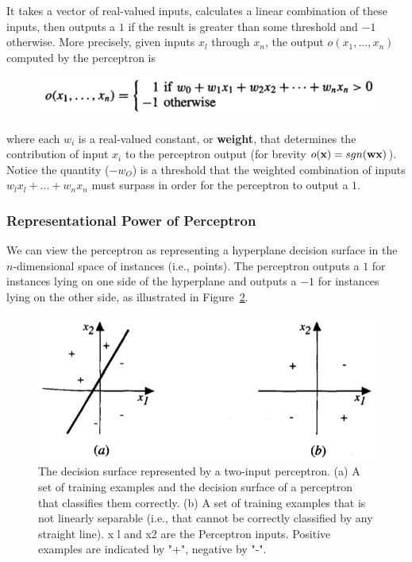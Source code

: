 \documentclass[../main.tex]{subfiles}
\begin{document}
\noindent It takes a vector of real-valued inputs, calculates a linear combination of these inputs, then outputs a $1$ if the result is greater than some threshold and $-1$ otherwise. More precisely, given inputs $x_l$ through $x_n$, the output $o(x_1, . . . , x_n)$ computed by the perceptron is
\begin{figure}[H]
    \centering
    \includegraphics[scale = 0.35]{lectures/4_neural_networks/4_out_perc.png}
    \label{fig:out_perc}
\end{figure}
\noindent where each $w_i$ is a real-valued constant, or \textbf{weight}, that determines the contribution of input $x_i$ to the perceptron output (for brevity $o(\bold{x})=sgn(\bold{wx})$). Notice the quantity ($-w_O$) is a threshold that the weighted combination of inputs $w_lx_l + . . . + w_nx_n$ must surpass in order for the perceptron to output a $1$.\\

\subsubsection{Representational Power of Perceptron}
We can view the perceptron as representing a hyperplane decision surface in the $n$-dimensional space of instances (i.e., points). The perceptron outputs a $1$ for instances lying on one side of the hyperplane and outputs a $-1$ for instances lying on the other side, as illustrated in Figure~\ref{fig:4_percp_linear_sep_and_no}.

\begin{figure}
    \centering
    \includegraphics[scale = 0.4]{lectures/4_neural_networks/4_percp_linear_sep_and_no.png}
    \caption{The decision surface represented by a two-input perceptron. (a) A set of training examples and the decision surface of a perceptron that classifies them correctly. (b) A set of training examples that is not linearly separable (i.e., that cannot be correctly classified by any straight line). x l and x2 are the Perceptron inputs. Positive examples are indicated by "+", negative by "-".}
    \label{fig:4_percp_linear_sep_and_no}
\end{figure}
\end{document}
